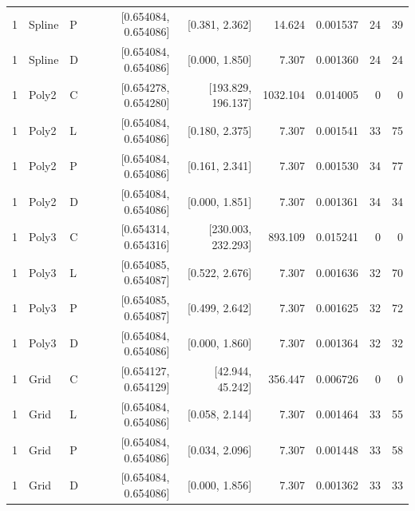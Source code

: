 \begin{longtable}{lllrrrrrr}
1 & Spline & P & [0.654084, 0.654086] & [0.381, 2.362] & 14.624 & 0.001537 & 24 & 39 \\
1 & Spline & D & [0.654084, 0.654086] & [0.000, 1.850] & 7.307 & 0.001360 & 24 & 24 \\
1 & Poly2 & C & [0.654278, 0.654280] & [193.829, 196.137] & 1032.104 & 0.014005 & 0 & 0 \\
1 & Poly2 & L & [0.654084, 0.654086] & [0.180, 2.375] & 7.307 & 0.001541 & 33 & 75 \\
1 & Poly2 & P & [0.654084, 0.654086] & [0.161, 2.341] & 7.307 & 0.001530 & 34 & 77 \\
1 & Poly2 & D & [0.654084, 0.654086] & [0.000, 1.851] & 7.307 & 0.001361 & 34 & 34 \\
1 & Poly3 & C & [0.654314, 0.654316] & [230.003, 232.293] & 893.109 & 0.015241 & 0 & 0 \\
1 & Poly3 & L & [0.654085, 0.654087] & [0.522, 2.676] & 7.307 & 0.001636 & 32 & 70 \\
1 & Poly3 & P & [0.654085, 0.654087] & [0.499, 2.642] & 7.307 & 0.001625 & 32 & 72 \\
1 & Poly3 & D & [0.654084, 0.654086] & [0.000, 1.860] & 7.307 & 0.001364 & 32 & 32 \\
1 & Grid & C & [0.654127, 0.654129] & [42.944, 45.242] & 356.447 & 0.006726 & 0 & 0 \\
1 & Grid & L & [0.654084, 0.654086] & [0.058, 2.144] & 7.307 & 0.001464 & 33 & 55 \\
1 & Grid & P & [0.654084, 0.654086] & [0.034, 2.096] & 7.307 & 0.001448 & 33 & 58 \\
1 & Grid & D & [0.654084, 0.654086] & [0.000, 1.856] & 7.307 & 0.001362 & 33 & 33 \\
\end{longtable}
\endgroup


